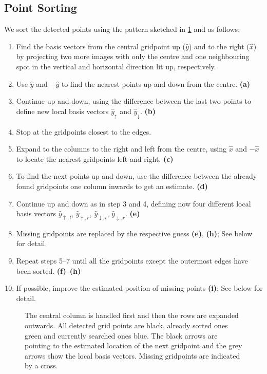 \subsection{Point Sorting}
We sort the detected points using the pattern sketched in \cref{fig:sorting_tikz} and as follows: 
\begin{enumerate}
    \item Find the basis vectors from the central gridpoint up ($\hat{y}$) and to the right ($\hat{x}$) by projecting two more images with only the centre and one neighbouring spot in the vertical and horizontal direction lit up, respectively. 
    \item Use $\hat{y}$ and $-\hat{y}$ to find the nearest points up and down from the centre. \textbf{(a)}
    \item Continue up and down, using the difference between the last two points to define new local basis vectors $\hat{y}_\uparrow$ and $\hat{y}_\downarrow$. \textbf{(b)}
    \item Stop at the gridpoints closest to the edges.
    \item Expand to the columns to the right and left from the centre, using $\hat{x}$ and $-\hat{x}$ to locate the nearest gridpoints left and right. \textbf{(c)}
    \item To find the next points up and down, use the difference between the already found gridpoints one column inwards to get an estimate. \textbf{(d)}
    \item Continue up and down as in step 3 and 4, defining now four different local basis vectors $\hat{y}_{\uparrow,l}$, $\hat{y}_{\uparrow,r}$, $\hat{y}_{\downarrow,l}$, $\hat{y}_{\downarrow,r}$. \textbf{(e)}
    \item Missing gridpoints are replaced by the respective guess \textbf{(e)}, \textbf{(h)}; See below for detail.
    \item Repeat steps 5--7 until all the gridpoints except the outermost edges have been sorted. \textbf{(f)}--\textbf{(h)}
    \item If possible, improve the estimated position of missing points \textbf{(i)}; See below for detail.
\end{enumerate}
\begin{figure}[tbp]
    \centering
    
    \vspace*{-5mm}
    \caption[Sketch of the point sorting algorithm]{The central column is handled first and then the rows are expanded outwards. All detected grid points are black, already sorted ones green and currently searched ones blue. The black arrows are pointing to the estimated location of the next gridpoint and the grey arrows show the local basis vectors. Missing gridpoints are indicated by a cross.}  
    \label{fig:sorting_tikz}
\end{figure}

